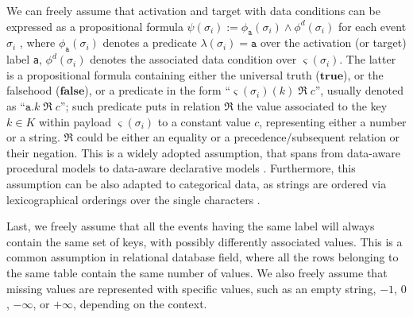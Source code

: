 We can freely assume that activation and target with data conditions can be expressed as a propositional formula $\psi(\sigma_i):=\phi_{\texttt{a}}(\sigma_i)\wedge \phi^d(\sigma_i)$ for each event $\sigma_i$ \cite{LenoDM18}, where $\phi_{\texttt{a}}(\sigma_i)$ denotes a predicate $\lambda(\sigma_i)=\texttt{a}$ over the activation (or target) label \texttt{a}, $\phi^d(\sigma_i)$ denotes the associated data condition over $\varsigma(\sigma_i)$. The latter is a
propositional formula containing either the universal truth ($\textbf{true}$), or the falsehood ($\textbf{false}$), or a predicate in the form ``$\varsigma(\sigma_i)(k)\;\Re\;c$'', usually denoted as ``$\texttt{a}.k\;\Re\;c$''; such predicate puts in relation $\Re$ the value associated to the key $k\in K$ within  payload $\varsigma(\sigma_i)$ to a constant value $c$, %
%
%
%
representing either a number or a string. $\Re$ could be either an equality or a precedence/subsequent relation or their negation. This is a widely adopted assumption, that spans from data-aware procedural models \cite{MultiPerspective} to data-aware declarative models \cite{10.1007/978-3-642-40176-3_8}. Furthermore, this assumption can be also adapted to categorical data, as strings are ordered via lexicographical orderings over the single characters \cite{MultiPerspective}.

Last, we freely assume that all the events having the same label will always contain the same set of keys, with possibly differently associated values. This is a common assumption in relational database field, where all the rows belonging to the same table contain the same number of values. We also freely assume that missing values are represented with specific values, such as an empty string, $-1$, $0$, $-\infty$, or $+\infty$, depending on the context.